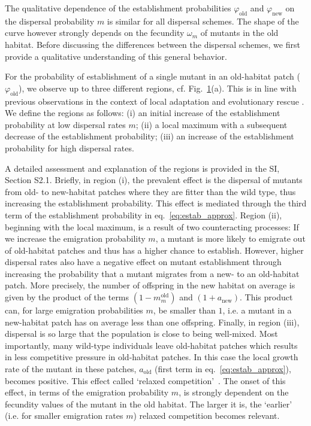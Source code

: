 \documentclass[a4paper,11pt]{article}
\newcommand{\chg}[1]{\textcolor{change}{#1}}
\begin{document}
\begin{figure}[t!]
	\label{fig:vary_m_est}
\end{figure}

The qualitative dependence of the establishment probabilities $\varphi_{\text{old}}$ and $\varphi_{\text{new}}$ on the dispersal probability $m$ is similar for all dispersal schemes. The shape of the curve however strongly depends on the fecundity $\omega_m$ of mutants in the old habitat. Before discussing the differences between the dispersal schemes, we first provide a qualitative understanding of this general behavior.

For the probability of establishment of a single mutant in an old-habitat patch ($\varphi_{\text{old}}$), we observe up to three different regions, cf. Fig.~\ref{fig:vary_m_est}(a). This is in line with previous observations in the context of local adaptation \citep[e.g.][]{kawecki_1995,tomasini_2018} and evolutionary rescue \citep{uecker_2014}. We define the regions as follows: (i) an initial increase of the establishment probability at low dispersal rates $m$; (ii) a local maximum with a subsequent decrease of the establishment probability; (iii) an increase of the establishment probability for high dispersal rates.

A detailed assessment and explanation of the regions is provided in the SI, Section S2.1. Briefly, in region (i), the prevalent effect is the dispersal of mutants from old- to new-habitat patches where they are fitter than the wild type, thus increasing the establishment probability. This effect is mediated through the third term of the establishment probability in eq.~\eqref{eq:estab_approx}. 
Region (ii), beginning with the local maximum, is a result of two counteracting processes: %
\chg{If we increase the emigration probability $m$, a mutant is more likely to emigrate out of old-habitat patches and thus has a higher chance to establish. However, higher dispersal rates also have a negative effect on mutant establishment through \linelabel{R2-32}increasing the probability that a mutant migrates from a new- to an old-habitat patch. More precisely, the number of offspring in the new habitat on average is given by the product of the terms $(1-m_m^{\text{old}})$ and $(1+a_{\text{new}})$. This product can, for large emigration probabilities $m$, be smaller than $1$, i.e. a mutant in a new-habitat patch has on average less than one offspring. Finally, in region (iii), dispersal is so large that the population is close to being well-mixed. Most importantly, many wild-type individuals leave old-habitat patches which results in less competitive pressure in old-habitat patches. In this case the local growth rate of the mutant in these patches, $a_{\text{old}}$ (first term in eq.~\eqref{eq:estab_approx}), becomes positive. This effect called `relaxed competition'~\citep{uecker_2014}. The onset of this effect, in terms of the emigration probability $m$, is strongly dependent on the fecundity values of the mutant in the old habitat. The larger it is, the `earlier' (i.e. for smaller emigration rates $m$) relaxed competition becomes relevant.} 
\end{document}
